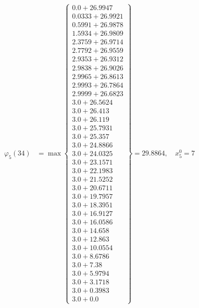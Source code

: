 \documentclass{article}
\begin{document}
\begin{align*}
\varphi_{5}(34) &= \max \left\{ \begin{array}{c}
0.0 + 26.9947 \\
 0.0333 + 26.9921 \\
 0.5991 + 26.9878 \\
 1.5934 + 26.9809 \\
 2.3759 + 26.9714 \\
 2.7792 + 26.9559 \\
 2.9353 + 26.9312 \\
 2.9838 + 26.9026 \\
 2.9965 + 26.8613 \\
 2.9993 + 26.7864 \\
 2.9999 + 26.6823 \\
 3.0 + 26.5624 \\
 3.0 + 26.413 \\
 3.0 + 26.119 \\
 3.0 + 25.7931 \\
 3.0 + 25.357 \\
 3.0 + 24.8866 \\
 3.0 + 24.0325 \\
 3.0 + 23.1571 \\
 3.0 + 22.1983 \\
 3.0 + 21.5252 \\
 3.0 + 20.6711 \\
 3.0 + 19.7957 \\
 3.0 + 18.3951 \\
 3.0 + 16.9127 \\
 3.0 + 16.0586 \\
 3.0 + 14.658 \\
 3.0 + 12.863 \\
 3.0 + 10.0554 \\
 3.0 + 8.6786 \\
 3.0 + 7.38 \\
 3.0 + 5.9794 \\
 3.0 + 3.1718 \\
 3.0 + 0.3983 \\
 3.0 + 0.0
\end{array} \right\}=29.8864, \quad x_{5}^0=7\\
  

\end{align*}
\end{document}
